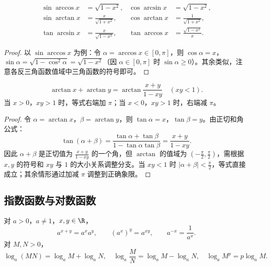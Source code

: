 \begin{proposition}[反三角函数的三角值]
	\[
	\begin{aligned}
		\sin\arccos x &= \sqrt{1-x^2}, & \cos\arcsin x &= \sqrt{1-x^2}, \\
		\sin\arctan x &= \frac{x}{\sqrt{1+x^2}}, & \cos\arctan x &= \frac{1}{\sqrt{1+x^2}}, \\
		\tan\arcsin x &= \frac{x}{\sqrt{1-x^2}}, & \tan\arccos x &= \frac{\sqrt{1-x^2}}{x}.
	\end{aligned}
	\]
\end{proposition}

\begin{proof}
	以 $\sin\arccos x$ 为例：令 $\alpha = \arccos x \in [0,\pi]$，则 $\cos\alpha = x$，$\sin\alpha = \sqrt{1-\cos^2\alpha} = \sqrt{1-x^2}$（因 $\alpha \in [0,\pi]$ 时 $\sin\alpha \geqslant 0$）。其余类似，注意各反三角函数值域中三角函数的符号即可。
\end{proof}

\begin{proposition}
	\[
	\arctan x + \arctan y = \arctan\frac{x+y}{1-xy} \quad (xy < 1).
	\]
	当 $x > 0$，$xy > 1$ 时，等式右端加 $\pi$；当 $x < 0$，$xy > 1$ 时，右端减 $\pi$。
\end{proposition}

\begin{proof}
	令 $\alpha = \arctan x$，$\beta = \arctan y$，则 $\tan\alpha = x$，$\tan\beta = y$。由正切和角公式：
	\[
	\tan(\alpha+\beta) = \frac{\tan\alpha + \tan\beta}{1 - \tan\alpha\tan\beta} = \frac{x+y}{1-xy}.
	\]
	因此 $\alpha+\beta$ 是正切值为 $\frac{x+y}{1-xy}$ 的一个角，但 $\arctan$ 的值域为 $(-\frac{\pi}{2}, \frac{\pi}{2})$，需根据 $x, y$ 的符号和 $xy$ 与 $1$ 的大小关系调整分支。当 $xy<1$ 时 $|\alpha+\beta| < \frac{\pi}{2}$，等式直接成立；其余情形通过加减 $\pi$ 调整到正确象限。
\end{proof}


\subsection*{指数函数与对数函数}



\begin{proposition}[指数与对数的基本运算法则]
	对 $a>0$，$a \neq 1$，$x, y \in \R$，
	\[
	a^{x+y} = a^x a^y, \qquad (a^x)^y = a^{xy}, \qquad a^{-x} = \frac{1}{a^x}.
	\]
	对 $M, N > 0$，
	\[
	\log_a(MN) = \log_a M + \log_a N, \quad
	\log_a\frac{M}{N} = \log_a M - \log_a N, \quad
	\log_a M^p = p \log_a M.
	\]
\end{proposition}

